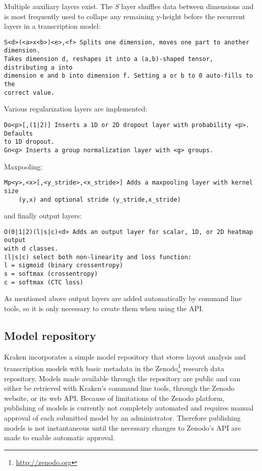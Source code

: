 Multiple auxiliary layers exist. The \emph{S} layer shuffles data between
dimensions and is most frequently used to collape any remaining y-height before
the recurrent layers in a transcription model:

\begin{verbatim}
S<d>(<a>x<b>)<e>,<f> Splits one dimension, moves one part to another dimension.
Takes dimension d, reshapes it into a (a,b)-shaped tensor, distributing a into
dimension e and b into dimension f. Setting a or b to 0 auto-fills to the
correct value.
\end{verbatim}

Various regularization layers are implemented:

\begin{verbatim}
Do<p>[,(1|2)] Inserts a 1D or 2D dropout layer with probability <p>. Defaults
to 1D dropout.
Gn<g> Inserts a group normalization layer with <g> groups.
\end{verbatim}

Maxpooling:

\begin{verbatim}
Mp<y>,<x>[,<y_stride>,<x_stride>] Adds a maxpooling layer with kernel size
	(y,x) and optional stride (y_stride,x_stride)
\end{verbatim}

and finally output layers:

\begin{verbatim}
O(0|1|2)(l|s|c)<d> Adds an output layer for scalar, 1D, or 2D heatmap output
with d classes.
(l|s|c) select both non-linearity and loss function:
l = sigmoid (binary crossentropy)
s = softmax (crossentropy)
c = softmax (CTC loss)
\end{verbatim}

As mentioned above output layers are added automatically by command line tools,
so it is only necessary to create them when using the API.



\subsection{Model repository}

Kraken incorporates a simple model repository that stores layout analysis and
transcription models with basic metadata in the
Zenodo\footnote{\url{http://zenodo.org}} research data repository. Models made
available through the repository are public and can either be retrieved with
Kraken's command line tools, through the Zenodo website, or its web API.
Because of limitations of the Zenodo platform, publishing of models is
currently not completely automated and requires manual approval of each
submitted model by an administrator. Therefore publishing models is not
instantaneous until the necessary changes to Zenodo's API are made to enable
automatic approval.


